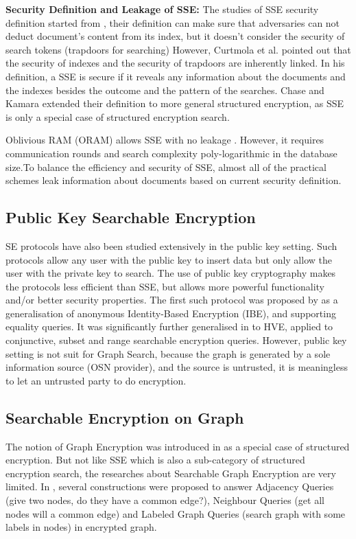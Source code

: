 {\bf Security Definition and Leakage of SSE:} The studies of SSE security definition started from \cite{goh2003secure}, their definition can make sure that adversaries can not deduct document's content from its index, but it doesn't consider the security of search tokens (trapdoors for searching) 
However, Curtmola et al. \cite{curtmola2011searchable} pointed out that the security of indexes and the security of trapdoors are inherently linked. In his definition, a SSE is secure if it reveals any information about the documents and the indexes besides the outcome and the pattern of the searches. 
Chase and Kamara \cite{chase2010structured} extended their definition to more general structured encryption, as SSE is only a special case of structured encryption search.

Oblivious RAM (ORAM) allows SSE with no leakage \cite{goldreich1996software}. However, it requires communication rounds and search complexity poly-logarithmic in the database size.To balance the efficiency and security of SSE, almost all of the practical schemes leak information about documents based on current security definition.

\subsection{Public Key Searchable Encryption}
SE protocols have also been studied extensively in the public key setting. Such protocols allow any user with the public key to insert data but only allow the user with the private key to search. The use of public key cryptography makes the protocols less efficient than SSE, but allows more powerful functionality and/or better security properties. 
The first such protocol was proposed by \cite{boneh2004public} as a generalisation of anonymous Identity-Based Encryption (IBE), and supporting equality queries. It was significantly further generalised in \cite{boneh2007conjunctive} to HVE, applied to conjunctive, subset and range searchable encryption queries. 
However, public key setting is not suit for Graph Search, because the graph is generated by a sole information source (OSN provider), and the source is untrusted, it is meaningless to let an untrusted party to do encryption.

\subsection{Searchable Encryption on Graph}
The notion of Graph Encryption was introduced in \cite{chase2010structured} as a special case of structured encryption. But not like SSE which is also a sub-category of structured encryption search, the researches about Searchable Graph Encryption are very limited.
In \cite{chase2010structured}, several constructions were proposed to answer Adjacency Queries (give two nodes, do they have a common edge?), Neighbour Queries (get all nodes will a common edge) and Labeled Graph Queries (search graph with some labels in nodes) in encrypted graph.

